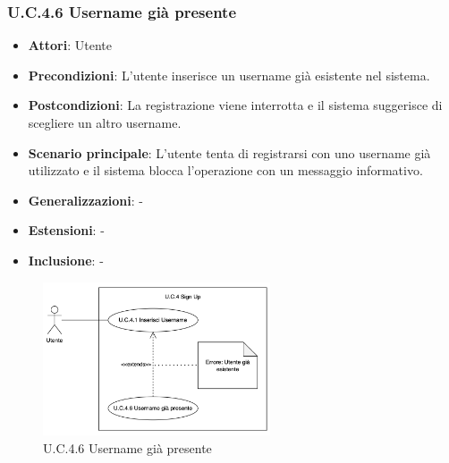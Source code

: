 \subsubsection{U.C.4.6 Username già presente}
\begin{itemize}
    \item \textbf{Attori}: Utente
    \item \textbf{Precondizioni}: L'utente inserisce un username già esistente nel sistema. 
    \item \textbf{Postcondizioni}: La registrazione viene interrotta e il sistema suggerisce di scegliere un altro username.
    \item \textbf{Scenario principale}: L'utente tenta di registrarsi con uno username già utilizzato e il sistema blocca l'operazione con un messaggio informativo. 
    \item \textbf{Generalizzazioni}: -
    \item \textbf{Estensioni}: -
    \item \textbf{Inclusione}: -
\end{itemize}
\begin{figure}[H]
    \centering
    \includegraphics[width=0.6\textwidth]{img/U.C.4.6.png}
    \caption{U.C.4.6 Username già presente}
\end{figure}
\newpage

